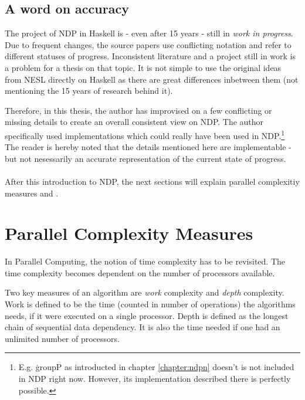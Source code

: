   \subsection{A word on accuracy}
    The project of NDP in Haskell is - even after 15 years -
    still in \textit{work in progress}. Due to frequent changes,
    the source papers use conflicting notation and refer to
    different statuses of progress. Inconsistent literature and a project
    still in work is a problem for a thesis on that topic.
    It is not simple to use the original ideas from NESL directly
    on Haskell as there are great differences inbetween them (not mentioning
    the 15 years of research behind it).
    
    Therefore, in this thesis, the author has improvised on a few conflicting or
    missing details to create an overall consistent view on NDP.
    The author specifically used implementations which could really have been
    used in NDP.\footnote{E.g. \c{groupP} as introducted in chapter \ref{chapter:ndpn} doesn't
    is not included in NDP right now. However, its implementation described there is perfectly possible.}
    The reader is hereby noted that the details
    mentioned here are implementable - but not nesessarily an accurate
    representation of the current state of progress.
    
    
  \paragraph{}
    After this introduction to NDP, the next sections will explain
    parallel complexitiy measures and \algo.
  
  \clearpage
  
\section{Parallel Complexity Measures}
  \label{section:parmeasures}
  In Parallel Computing, the notion of time complexity
  has to be revisited. The time complexity becomes dependent on the
  number of processors available.
  
  Two key measures of an algorithm are \emph{work} complexity
  and \emph{depth} complexity. Work is defined
  to be the time (counted in number of operations)
  the algorithms needs, if it were executed on a single processor.
  Depth is defined as the longest chain of sequential data dependency.
  It is also the time needed if one had an unlimited number of processors.
  

